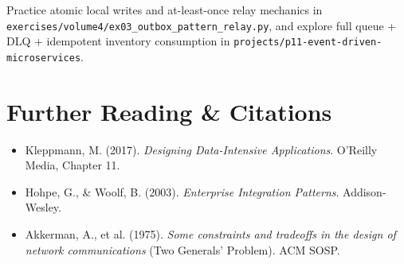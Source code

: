 \begin{labbridgebox}
Practice atomic local writes and at-least-once relay mechanics in \texttt{exercises/volume4/ex03\_outbox\_pattern\_relay.py}, and explore full queue + DLQ + idempotent inventory consumption in \texttt{projects/p11-event-driven-microservices}.
\end{labbridgebox}

\section{Further Reading \protect\& Citations}
\begin{itemize}[leftmargin=18pt]
  \item Kleppmann, M. (2017). \emph{Designing Data-Intensive Applications}. O'Reilly Media, Chapter 11.
  \item Hohpe, G., \& Woolf, B. (2003). \emph{Enterprise Integration Patterns}. Addison-Wesley.
  \item Akkerman, A., et al. (1975). \emph{Some constraints and tradeoffs in the design of network communications} (Two Generals' Problem). ACM SOSP.
\end{itemize}
